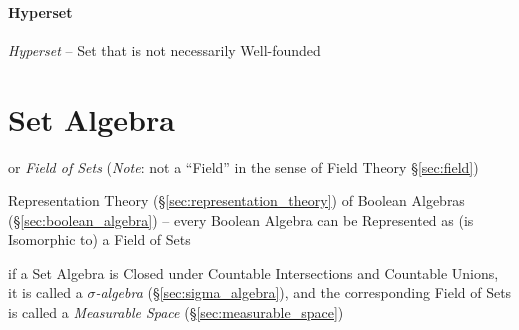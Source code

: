 \paragraph{Hyperset}\label{sec:hyperset}\hfill

\emph{Hyperset} -- Set that is not necessarily Well-founded



\section{Set Algebra}\label{sec:set_algebra}

or \emph{Field of Sets} (\emph{Note}: not a ``Field'' in the sense of Field
Theory \S\ref{sec:field})

Representation Theory (\S\ref{sec:representation_theory}) of Boolean Algebras
(\S\ref{sec:boolean_algebra}) -- every Boolean Algebra can be Represented as (is
Isomorphic to) a Field of Sets

if a Set Algebra is Closed under Countable Intersections and Countable Unions,
it is called a \emph{$\sigma$-algebra} (\S\ref{sec:sigma_algebra}), and the
corresponding Field of Sets is called a \emph{Measurable Space}
(\S\ref{sec:measurable_space})

